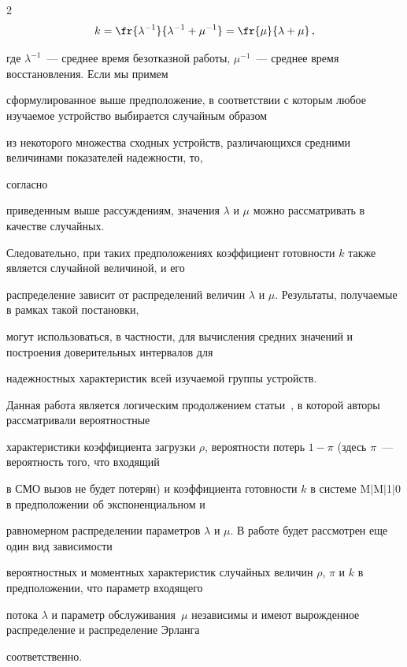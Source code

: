\begin{multicols}{2}
$$


k=\fr{\lambda^{-1}}{\lambda^{-1}+\mu^{-1}}=\fr{\mu}{\lambda+\mu}\,,


$$


где $\lambda^{-1}$~--- среднее время безотказной работы, $\mu^{-1}$~--- среднее время восстановления. Если мы примем


сформулированное выше предположение, в соответствии с которым любое изучаемое устройство выбирается случайным образом


из некоторого множества сходных устройств, различающихся средними величинами показателей надежности, то, %


соглас\-но


приведенным выше рассуждениям, значения $\lambda$ и $\mu$ можно рассматривать в качестве случайных.


Следовательно, при таких предположениях коэффициент готовности $k$ также является случайной величиной, и его


распределение зависит от распределений величин $\lambda$ и $\mu$. Результаты, получаемые в рамках такой постановки,


могут использоваться, в частности, для вычисления средних значений и построения доверительных интервалов для


надежностных характеристик всей изучаемой группы устройств.





Данная работа является логическим продолжением статьи~\cite{Apice06}, в которой авторы рассматривали вероятностные


характеристики коэффициента загрузки $\rho$, вероятности потерь $1-\pi$ (здесь $\pi$~--- вероятность того, что входящий


в СМО вызов не будет потерян) и коэффициента готовности $k$ в системе M$\vert$M$\vert$1$\vert$0 в предположении об экспоненциальном и


равномерном распределении параметров $\lambda$ и $\mu$. В работе будет рассмотрен еще один вид зависимости


вероятностных и моментных характеристик случайных величин $\rho$, $\pi$ и $k$ в предположении, что параметр входящего


потока $\lambda$ и параметр обслуживания~$\mu$ независимы и имеют вырожденное распределение и распределение Эрланга


соответственно.






\end{multicols}
